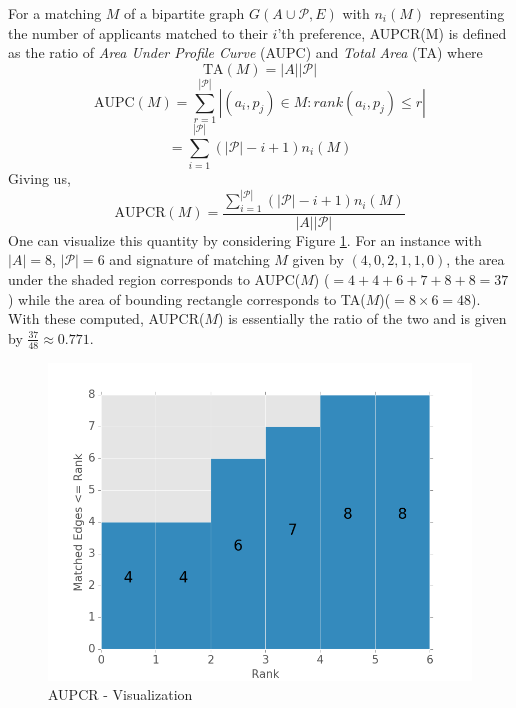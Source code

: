 \documentclass[letterpaper]{article} %
\begin{document}
For a matching $M$ of a bipartite graph $G(A\cup \mathcal{P}, E)$ with $n_i(M)$ representing the number of applicants matched to their $i$'th preference, AUPCR(M) is defined as the ratio of \textit{Area Under Profile Curve} (AUPC) and \textit{Total Area} (TA) where
\begin{equation}
\text{TA}(M) = {|A||\mathcal{P}|}
\end{equation}
\begin{equation*}
\text{AUPC}(M) = {\sum_{r=1}^{|\mathcal{P}|}|(a_{i},p_{j}) \in M:rank(a_{i},p_{j})\leq r|}
\end{equation*}
\begin{equation} \label{defAupc}
= {\sum_{i=1}^{|\mathcal{P}|} (|\mathcal{P}|-i+1) n_i(M)}
\end{equation}
Giving us,
\begin{equation} \label{defAupcr}
\text{AUPCR}(M) = \frac{\sum_{i=1}^{|\mathcal{P}|} (|\mathcal{P}|-i+1) n_i(M)}{|A||\mathcal{P}|}
\end{equation}
One can visualize this quantity by considering Figure \ref{AUPCR}. For an instance with $|A|=8$, $|\mathcal{P}|=6$ and signature of matching $M$ given by $(4,0,2,1,1,0)$, the area under the shaded region corresponds to AUPC($M$) ($= 4+4+6+7+8+8 = 37$) while the area of bounding rectangle corresponds to TA($M$)($=8 \times 6=48$). With these computed, AUPCR($M$) is essentially the ratio of the two and is given by $\frac{37}{48} \approx 0.771$.
\begin{figure}[h]
\centering
\includegraphics[scale=0.35]{aupcr.png}
\caption{AUPCR - Visualization}
\label{AUPCR}
\end{figure}
\end{document}
